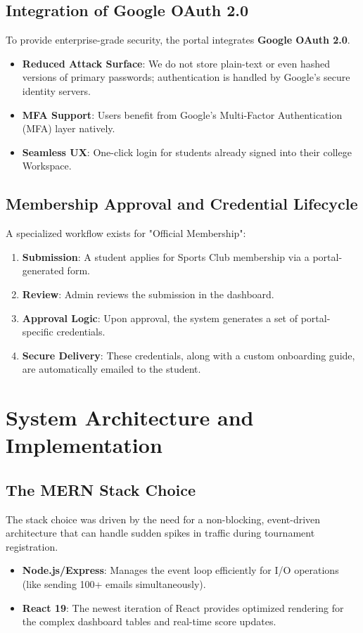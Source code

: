 \documentclass[12pt,a4paper]{article}
\begin{document}
\subsection{Integration of Google OAuth 2.0}
To provide enterprise-grade security, the portal integrates \textbf{Google OAuth 2.0}.
\begin{itemize}
    \item \textbf{Reduced Attack Surface}: We do not store plain-text or even hashed versions of primary passwords; authentication is handled by Google's secure identity servers.
    \item \textbf{MFA Support}: Users benefit from Google's Multi-Factor Authentication (MFA) layer natively.
    \item \textbf{Seamless UX}: One-click login for students already signed into their college Workspace.
\end{itemize}

\subsection{Membership Approval and Credential Lifecycle}
A specialized workflow exists for "Official Membership":
\begin{enumerate}
    \item \textbf{Submission}: A student applies for Sports Club membership via a portal-generated form.
    \item \textbf{Review}: Admin reviews the submission in the dashboard.
    \item \textbf{Approval Logic}: Upon approval, the system generates a set of portal-specific credentials.
    \item \textbf{Secure Delivery}: These credentials, along with a custom onboarding guide, are automatically emailed to the student.
\end{enumerate}

\section{System Architecture and Implementation}

\subsection{The MERN Stack Choice}
The stack choice was driven by the need for a non-blocking, event-driven architecture that can handle sudden spikes in traffic during tournament registration.
\begin{itemize}
    \item \textbf{Node.js/Express}: Manages the event loop efficiently for I/O operations (like sending 100+ emails simultaneously).
    \item \textbf{React 19}: The newest iteration of React provides optimized rendering for the complex dashboard tables and real-time score updates.
\end{itemize}
\end{document}
